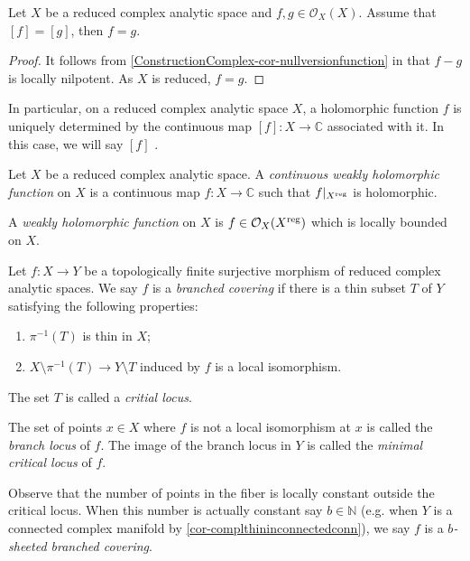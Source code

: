 \begin{proposition}\label{prop-reducedspacefunctiondetermineholo}
    Let $X$ be a reduced complex analytic space and $f,g\in \mathcal{O}_X(X)$. Assume that $[f]=[g]$, then $f=g$.
\end{proposition}
\begin{proof}
    It follows from \cref{ConstructionComplex-cor-nullversionfunction} in  that $f-g$ is locally nilpotent. As $X$ is reduced, $f=g$.
\end{proof}
In particular, on a reduced complex analytic space $X$, a holomorphic function $f$ is uniquely determined by the continuous map $[f]:X\rightarrow \mathbb{C}$ associated with it. In this case, we will say $[f]$ .

\begin{definition}
    Let $X$ be a reduced complex analytic space. A \emph{continuous weakly holomorphic function} on $X$ is a continuous map $f:X\rightarrow \mathbb{C}$ such that $f|_{X^{\operatorname{reg}}}$ is holomorphic.

    A \emph{weakly holomorphic function} on $X$ is $f\in \mathcal{O}_X(X^{\operatorname{reg}})$ which is locally bounded on $X$.
\end{definition}

\begin{definition}
    Let $f:X\rightarrow Y$ be a topologically finite surjective morphism of reduced complex analytic spaces. We say $f$ is a \emph{branched covering} if there is a thin subset $T$ of $Y$ satisfying the following properties:
    \begin{enumerate}
        \item $\pi^{-1}(T)$ is thin in $X$;
        \item $X\setminus \pi^{-1}(T)\rightarrow Y\setminus T$ induced by $f$ is a local isomorphism.
    \end{enumerate}
    The set $T$ is called a \emph{critial locus}.

    The set of points $x\in X$ where $f$ is not a local isomorphism at $x$ is called the \emph{branch locus} of $f$. The image of the branch locus in $Y$ is called the \emph{minimal critical locus} of $f$.

    Observe that the number of points in the fiber is locally constant outside the critical locus. When this number is actually constant say $b\in \mathbb{N}$ (e.g. when $Y$ is a connected complex manifold by \cref{cor-complthininconnectedconn}), we say $f$ is a \emph{$b$-sheeted branched covering}.
\end{definition}

